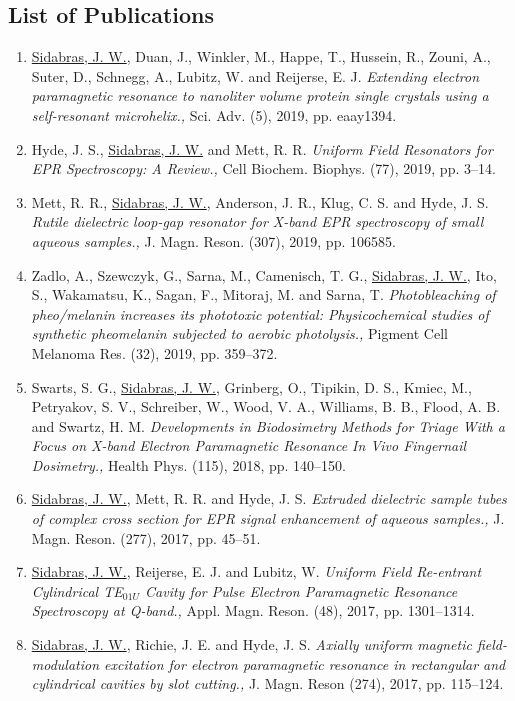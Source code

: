 \subsection*{List of Publications}
\begin{enumerate}
\itemsep0em 
    \item \underline{Sidabras, J. W.}, Duan, J., Winkler, M., Happe, T., Hussein, R., Zouni, A., Suter, D., Schnegg, A., Lubitz, W. and Reijerse, E. J. \textit{Extending electron paramagnetic resonance to nanoliter volume protein single crystals using a self-resonant microhelix.,} Sci. Adv. (5), 2019, pp. eaay1394.
    \item Hyde, J. S., \underline{Sidabras, J. W.} and Mett, R. R. \textit{Uniform Field Resonators for EPR Spectroscopy: A Review.,} Cell Biochem. Biophys. (77), 2019, pp. 3--14.
    \item Mett, R. R., \underline{Sidabras, J. W.}, Anderson, J. R., Klug, C. S. and Hyde, J. S. \textit{Rutile dielectric loop-gap resonator for X-band EPR spectroscopy of small aqueous samples.,} J. Magn. Reson. (307), 2019, pp. 106585.
    \item Zadlo, A., Szewczyk, G., Sarna, M., Camenisch, T. G., \underline{Sidabras, J. W.}, Ito, S., Wakamatsu, K., Sagan, F., Mitoraj, M. and Sarna, T. \textit{Photobleaching of pheo\-/melanin increases its phototoxic potential: Physicochemical studies of synthetic pheomelanin subjected to aerobic photolysis.,} Pigment Cell Melanoma Res. (32), 2019, pp. 359--372.
    \item Swarts, S. G., \underline{Sidabras, J. W.}, Grinberg, O., Tipikin, D. S., Kmiec, M., Petryakov, S. V., Schreiber, W., Wood, V. A., Williams, B. B., Flood, A. B. and Swartz, H. M. \textit{Developments in Biodosimetry Methods for Triage With a Focus on X-band Electron Paramagnetic Resonance In Vivo Fingernail Dosimetry.,} Health Phys. (115), 2018, pp. 140--150.
    \item \underline{Sidabras, J. W.}, Mett, R. R. and Hyde, J. S. \textit{Extruded dielectric sample tubes of complex cross section for EPR signal enhancement of aqueous samples.,} J. Magn. Reson. (277), 2017, pp. 45--51.
    \item \underline{Sidabras, J. W.}, Reijerse, E. J. and Lubitz, W. \textit{Uniform Field Re-entrant Cylindrical TE$_{01U}$ Cavity for Pulse Electron Paramagnetic Resonance Spectroscopy at Q-band.,} Appl. Magn. Reson. (48), 2017, pp. 1301--1314.
    \item \underline{Sidabras, J. W.}, Richie, J. E. and Hyde, J. S. \textit{Axially uniform magnetic field-modulation excitation for electron paramagnetic resonance in rectangular and cylindrical cavities by slot cutting.,} J. Magn. Reson (274), 2017, pp. 115--124.

\end{enumerate}
